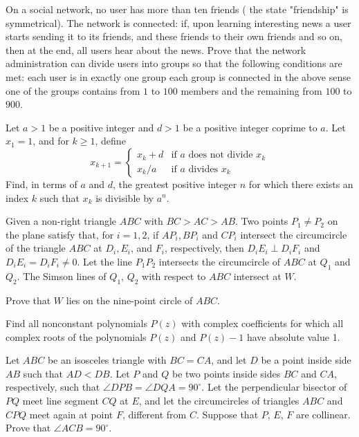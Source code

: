 \documentclass[11pt]{scrartcl}
\begin{document}
\begin{problem}[6029540617185205962]
On a social network, no user has more than ten friends ( the state "friendship" is symmetrical). The network is connected: if, upon learning interesting news a user starts sending it to its friends, and these friends to their own friends and so on, then at the end, all users hear about the news.
Prove that the network administration can divide users into groups so that the following conditions are met:
each user is in exactly one group
each group is connected in the above sense
one of the groups contains from $1$ to $100$ members and the remaining from $100$ to $900$.
\end{problem}
\begin{problem}[3159161448000677570]
Let $a > 1$ be a positive integer and $d > 1$ be a positive integer coprime to $a$. Let $x_1=1$, and for $k\geq 1$, define
$$x_{k+1} = \begin{cases}
x_k + d &\text{if } a \text{ does not divide } x_k \\
x_k/a & \text{if } a \text{ divides } x_k
\end{cases}$$Find, in terms of $a$ and $d$, the greatest positive integer $n$ for which there exists an index $k$ such that $x_k$ is divisible by $a^n$.
\end{problem}
\begin{problem}[8895719454292056765]
Given a non-right triangle $ABC$ with $BC>AC>AB$. Two points $P_1 \neq P_2$ on the plane satisfy that, for $i=1,2$, if $AP_i, BP_i$ and $CP_i$ intersect the circumcircle of the triangle $ABC$ at $D_i, E_i$, and $F_i$, respectively, then $D_iE_i \perp D_iF_i$ and $D_iE_i = D_iF_i \neq 0$. Let the line $P_1P_2$ intersects the circumcircle of $ABC$ at $Q_1$ and $Q_2$. The Simson lines of $Q_1$, $Q_2$ with respect to $ABC$ intersect at $W$.

Prove that $W$ lies on the nine-point circle of $ABC$.
\end{problem}
\begin{problem}[16134758174084]
Find all nonconstant polynomials $P(z)$ with complex coefficients for which all complex roots of the polynomials $P(z)$ and $P(z) - 1$ have absolute value 1.

\end{problem}
\begin{problem}[6302540840099076878]
Let $ABC$ be an isosceles triangle with $BC=CA$, and let $D$ be a point inside side $AB$ such that $AD< DB$. Let $P$ and $Q$ be two points inside sides $BC$ and $CA$, respectively, such that $\angle DPB = \angle DQA = 90^{\circ}$. Let the perpendicular bisector of $PQ$ meet line segment $CQ$ at $E$, and let the circumcircles of triangles $ABC$ and $CPQ$ meet again at point $F$, different from $C$.
Suppose that $P$, $E$, $F$ are collinear. Prove that $\angle ACB = 90^{\circ}$.
\end{problem}
\end{document}
